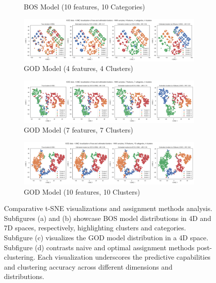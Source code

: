 \begin{figure}[H]
\begin{subfigure}[b]{0.49\textwidth}
        \caption{BOS Model (10 features, 10 Categories)}
        \label{fig:tsne_bos_10d}
    \end{subfigure}
    \hfill
    \begin{subfigure}[b]{0.49\textwidth}
        \includegraphics[width=\textwidth]{python_figures/tsne_god_n1000_d4_m4_k4.png}
        \caption{GOD Model (4 features, 4 Clusters)}
        \label{fig:tsne_god_4d}
    \end{subfigure}
    \newline
    \begin{subfigure}[b]{0.49\textwidth}
        \includegraphics[width=\textwidth]{python_figures/tsne_god_n1000_d7_m7_k4.png}
        \caption{GOD Model (7 features, 7 Clusters)}
        \label{fig:tsne_god_7d}
    \end{subfigure}
    \hfill
    \begin{subfigure}[b]{0.49\textwidth}
        \includegraphics[width=\textwidth]{python_figures/tsne_god_n1000_d10_m10_k4.png}
        \caption{GOD Model (10 features, 10 Clusters)}
        \label{fig:tsne_god_10d}
    \end{subfigure}
    \caption{Comparative t-SNE visualizations and assignment methods analysis. Subfigures (a) and (b) showcase BOS model distributions in 4D and 7D spaces, respectively, highlighting clusters and categories. Subfigure (c) visualizes the GOD model distribution in a 4D space. Subfigure (d) contrasts naive and optimal assignment methods post-clustering. Each visualization underscores the predictive capabilities and clustering accuracy across different dimensions and distributions.}
    \label{fig:tsne_comparative_analysis}
\end{figure}


